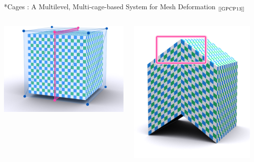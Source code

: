 \documentclass[xcolor=x11names,compress]{beamer}
\renewcommand{\(}{\begin{columns}} \renewcommand{\)}{\end{columns}}
\newcommand{\<}[1]{\begin{column}{#1}} \renewcommand{\>}{\end{column}}
\begin{document}
\begin{frame}{*Cages : A Multilevel, Multi-cage-based System for Mesh Deformation 
  $_{[\text{\cite{GPCP13}}]}$}
  \centering
  \begin{columns}[t]
    \begin{column}{0.3\textwidth}
      \includegraphics[scale=0.15]{starCages-Boite-Avant}
    \end{column}
    \begin{column}{0.3\textwidth}
      \centering
      \includegraphics[scale=0.15]{starCages-Boite-Sans} \\

\end{column}
\end{columns}
\end{frame}
\end{document}
